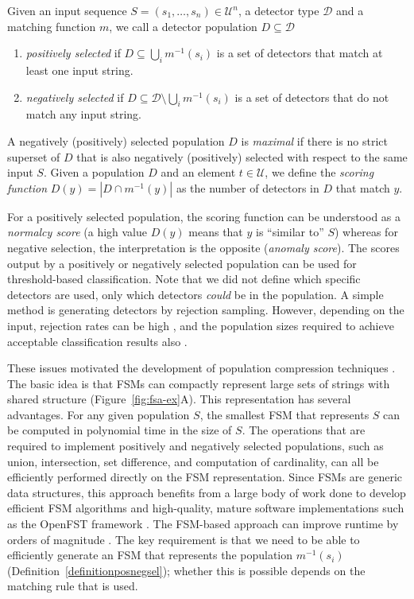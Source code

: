 \documentclass{llncs}
\begin{document}
\begin{definition}
Given an input sequence  $S=(s_1,\ldots,s_n) \in \mathcal{U}^n$, 
a detector type $\mathcal{D}$ and a matching function $m$,  we call a 
detector population $D \subseteq \mathcal{D}$
\begin{enumerate}
\item \emph{positively selected} if $D \subseteq \bigcup_i m^{-1}(s_i)$ is a set of detectors 
that match at least one input string.
\item \emph{negatively selected} if $D \subseteq \mathcal{D} \setminus \bigcup_i m^{-1}(s_i)$ 
is a set of detectors that do not match any input string. 
\end{enumerate}

A negatively (positively) selected population $D$ is \emph{maximal} if there is no strict superset of $D$ that is also negatively (positively) selected with respect to the same input $S$. Given a population $D$ and an element $t \in \mathcal{U}$, we define the \emph{scoring function} $D(y) =  |D \cap m^{-1}(y)|$ as the number of detectors in $D$ that match $y$. 
\label{definitionposnegsel} %
\end{definition}

For a positively selected population, the scoring function can be understood as a \emph{normalcy score} (a high value $D(y)$ means that $y$ is ``similar to'' $S$) whereas for negative selection, the interpretation is the opposite (\emph{anomaly score}). The scores output by a positively or negatively selected population can be used for threshold-based classification. Note that we did not define which specific detectors are used, only which detectors \emph{could} be in the population. A simple method is generating detectors by rejection sampling. However, depending on the input, rejection rates can be high \cite{Dhaeseleer1996,Dhaeseleer1996b}, and the population sizes required to achieve acceptable classification results also %
\cite{Stibor2005}. 

These issues motivated the development of population compression 
techniques \cite{Elberfeld_2009,Elberfeld2011}.
The basic idea is that FSMs can compactly represent large sets of strings with 
shared structure (Figure~\ref{fig:fsa-ex}A). This representation has several advantages.
For any given population $S$, the smallest FSM that represents $S$ can be computed in polynomial time in the 
size of $S$. The operations that are required to implement positively and negatively selected populations,
such as union, intersection, set difference, and computation of cardinality, can all be efficiently performed directly 
on the FSM representation.  Since FSMs are generic data structures, this approach benefits 
from a large body of work done to develop efficient FSM algorithms and high-quality, mature software implementations 
such as the OpenFST framework \cite{openfst}. 
The FSM-based approach can improve runtime by orders of 
magnitude \cite{Textor2012,Textor2014}. The key requirement is that we need to be able to efficiently generate
an FSM that represents the population $m^{-1}(s_i)$ (Definition~\ref{definitionposnegsel}); whether this is possible
depends on the matching rule that is used.
\end{document}
